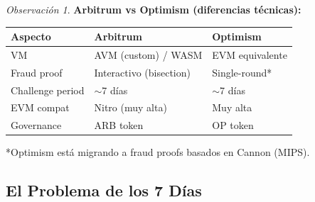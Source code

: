 \documentclass[11pt,a4paper,twoside,openright]{book}
\theoremstyle{definition}
\theoremstyle{plain}
\theoremstyle{remark}
\newtheorem{remark}{Observación}[chapter]
\begin{document}
\begin{remark}
\textbf{Arbitrum vs Optimism (diferencias técnicas):}

\begin{center}
\begin{tabular}{lll}
\toprule
\textbf{Aspecto} & \textbf{Arbitrum} & \textbf{Optimism} \\
\midrule
VM & AVM (custom) / WASM & EVM equivalente \\
Fraud proof & Interactivo (bisection) & Single-round* \\
Challenge period & $\sim$7 días & $\sim$7 días \\
EVM compat & Nitro (muy alta) & Muy alta \\
Governance & ARB token & OP token \\
\bottomrule
\end{tabular}
\end{center}

*Optimism está migrando a fraud proofs basados en Cannon (MIPS).
\end{remark}

\subsection{El Problema de los 7 Días}
\end{document}
